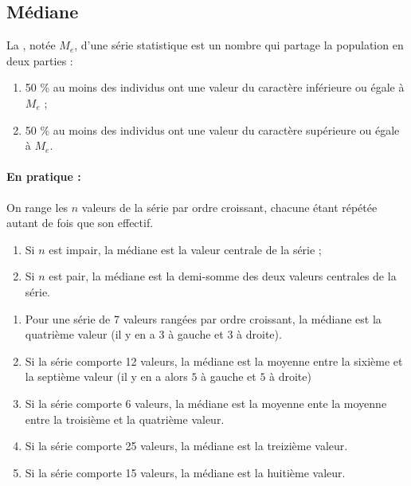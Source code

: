 \subsection{Médiane}

\begin{definition}
    La , notée $M_e$, d'une série statistique est un
  nombre qui partage la population en deux parties :
  \begin{enumerate}
  \item 50 \% au moins des individus ont une valeur du caractère
    inférieure ou égale à $M_e$ ;
  \item 50 \% au moins des individus ont une valeur du caractère
    supérieure ou égale à $M_e$.
  \end{enumerate}  

    
\end{definition}


\paragraph{En pratique :}On range les $n$ valeurs de la série par ordre
  croissant, chacune étant répétée autant de fois que son effectif.


\begin{enumerate}
\item Si $n$ est impair, la médiane est la valeur centrale de la série ;
\item Si $n$ est pair, la médiane est la demi-somme des deux valeurs
  centrales de la série.
\end{enumerate}

\medskip

\begin{example}
\begin{enumerate}
\item Pour une série de 7 valeurs rangées par ordre
    croissant, la médiane est la quatrième valeur (il y en a \( 3\) à gauche et \( 3\) à droite).
\item Si la série comporte 12 valeurs, la médiane est la moyenne entre la sixième et la septième valeur (il y en a alors \( 5\) à gauche et \( 5\) à droite)
\item Si la série comporte 6 valeurs, la médiane est la moyenne ente la moyenne entre la troisième et la quatrième valeur. 
\item Si la série comporte 25 valeurs, la médiane est la treizième valeur.
\item Si la série comporte 15 valeurs, la médiane est la huitième valeur.
\end{enumerate}
    
\end{example}

